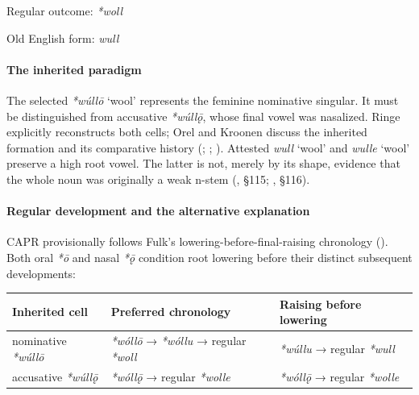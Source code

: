 \documentclass[
  british,
  a4paper,
]{article}
\newcounter{none} %
\providecommand{\Recon}[1]{\emph{*#1}}
\begin{document}
Regular outcome: \Recon{woll}

Old English form: \emph{wull}

\paragraph{The inherited paradigm}\label{the-inherited-paradigm}

The selected \Recon{wúllō} `wool' represents the feminine nominative
singular. It must be distinguished from accusative \emph{*wúllǭ}, whose
final vowel was nasalized. Ringe explicitly reconstructs both cells;
Orel and Kroonen discuss the inherited formation and its comparative
history (;
;
). Attested
{\emph{wull}} `wool' and {\emph{wulle}} `wool' preserve a high root
vowel. The latter is not, merely by its shape, evidence that the whole
noun was originally a weak n-stem (, §115; ,
§116).

\paragraph{Regular development and the alternative
explanation}\label{regular-development-and-the-alternative-explanation}

CAPR provisionally follows Fulk's lowering-before-final-raising
chronology (). Both oral \emph{*ō}
and nasal \emph{*ǭ} condition root lowering before their distinct
subsequent developments:

{\def\LTcaptype{none} %
\begin{longtable}[]{@{}
  >{\raggedright\arraybackslash}p{}
  >{\raggedright\arraybackslash}p{}
  >{\raggedright\arraybackslash}p{}@{}}
\toprule\noalign{}
\begin{minipage}[b]{\linewidth}\raggedright
Inherited cell
\end{minipage} & \begin{minipage}[b]{\linewidth}\raggedright
Preferred chronology
\end{minipage} & \begin{minipage}[b]{\linewidth}\raggedright
Raising before lowering
\end{minipage} \\
\midrule\noalign{}
\endhead
\bottomrule\noalign{}
\endlastfoot
nominative \emph{*wúllō} & \emph{*wóllō} → \emph{*wóllu} → regular
\emph{*woll} & \emph{*wúllu} → regular \emph{*wull} \\
accusative \emph{*wúllǭ} & \emph{*wóllǭ} → regular \emph{*wolle} &
\emph{*wóllǭ} → regular \emph{*wolle} \\
\end{longtable}
}
\end{document}

